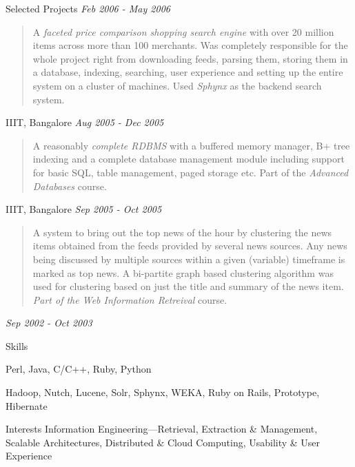 \documentclass{resume}
\newcommand{\period}{\hfill\small\sl}
\begin{document}
\begin{category}{Selected Projects}
     {\period Feb 2006 - May 2006}
    \begin{quote}
        A {\em faceted price comparison shopping search engine} with over 20 million items across more than 100 merchants. Was completely responsible for the whole project right from downloading feeds, parsing them, storing them in a database, indexing, searching, user experience and setting up the entire system on a cluster of machines. Used {\em Sphynx} as the backend search system.
    \end{quote}

     IIIT, Bangalore {\period Aug 2005 - Dec 2005}
    \begin{quote}
        A reasonably {\em complete RDBMS} with a buffered memory manager, B+ tree indexing and a complete database management module including support for basic SQL, table management, paged storage etc. Part of the {\em Advanced Databases} course.
    \end{quote}

     IIIT, Bangalore {\period Sep 2005 - Oct 2005}
    \begin{quote}
        A system to bring out the top news of the hour by clustering the news items obtained from the feeds provided by several news sources. Any news being discussed by multiple sources within a given (variable) timeframe is marked as top news. A bi-partite graph based clustering algorithm was used for clustering based on just the title and summary of the news item. {\em Part of the Web Information Retreival} course.
    \end{quote}

     {\period Sep 2002 - Oct 2003}
    \begin{quote}
    \end{quote}

\end{category}


\begin{category}{Skills}

     Perl, Java, C/C++, Ruby, Python

     Hadoop, Nutch, Lucene, Solr, Sphynx, WEKA, Ruby on Rails, Prototype, Hibernate

\end{category}


\begin{category}{Interests}
    \citemnobullet Information Engineering---Retrieval, Extraction \& Management, Scalable Architectures, Distributed \& Cloud Computing, Usability \& User Experience
\end{category}
\end{document}
